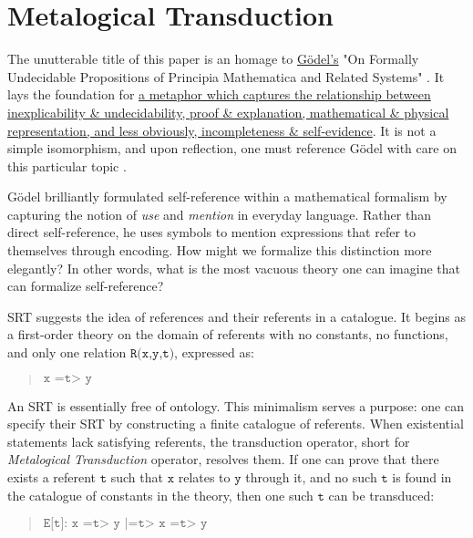 \documentclass[runningheads]{llncs}
\newcommand{\lib}[2]{\href{https://dna-platform.github.io/inexplicable-phenomena#1}{#2}\xspace}
\begin{document}
\section{Metalogical Transduction}

The unutterable title of this paper is an homage to \lib{/a-novel-perspective/a-novel-perspective.html}{Gödel's} "On Formally Undecidable Propositions of Principia Mathematica and Related Systems" \cite{Godel1962} \cite{Godel1931}. It lays the foundation for \href{https://dna-platform.github.io/inexplicable-phenomena//a-novel-perspective/a-novel-perspective.html}{a metaphor which captures the relationship between inexplicability \& undecidability, proof \& explanation, mathematical \& physical representation, and less obviously, incompleteness \& self-evidence}\xspace. It is not a simple isomorphism, and upon reflection, one must reference Gödel with care on this particular topic\cite{Feferman1995} \cite{Feferman1991}.

Gödel brilliantly formulated self-reference within a mathematical formalism by capturing the notion of \emph{use} and \emph{mention} in everyday language\cite{Quine1940}. Rather than direct self-reference, he uses symbols to mention expressions that refer to themselves through encoding. How might we formalize this distinction more elegantly? In other words, what is the most vacuous theory one can imagine that can formalize self-reference?

SRT suggests the idea of references and their referents in a catalogue. It begins as a first-order theory on the domain of referents with no constants, no functions, and only one relation $\texttt{R(x,y,t)}$, expressed as:

\begin{quote}
$\texttt{x =t> y}$
\end{quote}

An SRT is essentially free of ontology. This minimalism serves a purpose: one can specify their SRT by constructing a finite catalogue of referents. When existential statements lack satisfying referents, the transduction operator, short for \emph{Metalogical Transduction} operator, resolves them. If one can prove that there exists a referent $\texttt{t}$ such that $\texttt{x}$ relates to $\texttt{y}$ through it, and no such $\texttt{t}$ is found in the catalogue of constants in the theory, then one such $\texttt{t}$ can be transduced:

\begin{quote}
$\texttt{E[t]: x =t> y |=t> x =t> y}$
\end{quote}
\end{document}
